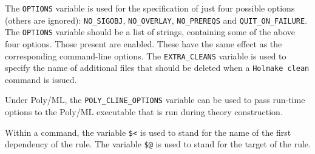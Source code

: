 The \texttt{OPTIONS} variable is used for the specification of just
four possible options (others are ignored): \texttt{NO\_SIGOBJ},
\texttt{NO\_OVERLAY}, \texttt{NO\_PREREQS} and
\texttt{QUIT\_ON\_FAILURE}.  The \texttt{OPTIONS} variable should be a
list of strings, containing some of the above four options.  Those
present are enabled.  These have the same effect as the corresponding
command-line options. The \texttt{EXTRA\_CLEANS} variable is used to
specify the name of additional files that should be deleted when a
\texttt{Holmake clean} command is issued.

Under Poly/ML, the \texttt{POLY\_CLINE\_OPTIONS} variable can be used to pass run-time options to the Poly/ML executable that is run during theory construction.

Within a command, the variable \texttt{\$<} is used to stand for the
name of the first dependency of the rule.  The variable \texttt{\$@} is
used to stand for the target of the rule.

